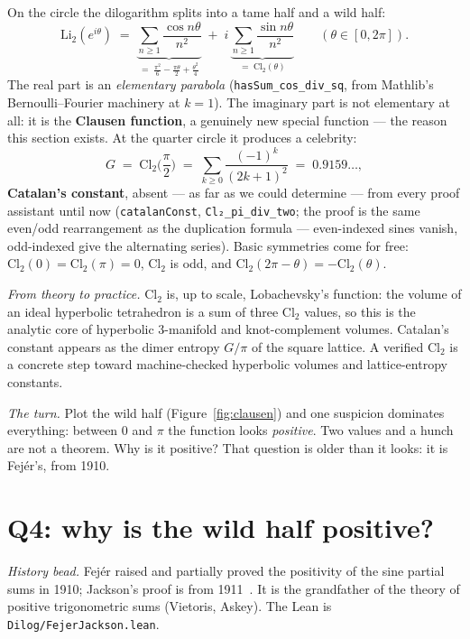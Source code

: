 \documentclass[11pt]{article}
\newcommand{\lean}[1]{\texttt{#1}}
\newcommand{\Li}{\mathrm{Li}_2}
\newcommand{\Cl}{\mathrm{Cl}_2}
\begin{document}
On the circle the dilogarithm splits into a tame half and a wild half:
\[
\Li(e^{i\theta}) \;=\;
\underbrace{\sum_{n\ge1}\frac{\cos n\theta}{n^2}}_{\textstyle
  =\;\frac{\pi^2}{6}-\frac{\pi\theta}{2}+\frac{\theta^2}{4}}
\;+\; i\,\underbrace{\sum_{n\ge1}\frac{\sin n\theta}{n^2}}_{\textstyle =\;\Cl(\theta)}
\qquad(\theta\in[0,2\pi]).
\]
The real part is an \emph{elementary parabola}
(\lean{hasSum\_cos\_div\_sq}, from Mathlib's Bernoulli--Fourier machinery at $k=1$).
The imaginary part is not elementary at all: it is the \textbf{Clausen function}, a
genuinely new special function --- the reason this section exists. At the quarter circle
it produces a celebrity:
\[
G \;=\; \Cl\!\Big(\frac{\pi}{2}\Big) \;=\; \sum_{k\ge0}\frac{(-1)^k}{(2k+1)^2}
\;=\;0.9159\ldots,
\]
\textbf{Catalan's constant}, absent --- as far as we could determine --- from every
proof assistant until now
(\lean{catalanConst}, \lean{Cl₂\_pi\_div\_two}; the proof is the same even/odd
rearrangement as the duplication formula --- even-indexed sines vanish, odd-indexed give
the alternating series). Basic symmetries come for free: $\Cl(0)=\Cl(\pi)=0$, $\Cl$ is
odd, and $\Cl(2\pi-\theta)=-\Cl(\theta)$.

\emph{From theory to practice.} $\Cl$ is, up to scale, Lobachevsky's function: the volume
of an ideal hyperbolic tetrahedron is a sum of three $\Cl$ values, so this is the
analytic core of hyperbolic $3$-manifold and knot-complement volumes. Catalan's constant
appears as the dimer entropy $G/\pi$ of the square lattice. A verified $\Cl$ is a
concrete step toward machine-checked hyperbolic volumes and lattice-entropy constants.

\emph{The turn.} Plot the wild half (Figure~\ref{fig:clausen}) and one suspicion
dominates everything: between $0$ and $\pi$ the function looks \emph{positive}. Two
values and a hunch are not a theorem. Why is it positive? That question is older than
it looks: it is Fej\'er's, from 1910.

\section{Q4: why is the wild half positive?}\label{sec:fejer}

\emph{History bead.} Fej\'er raised and partially proved the positivity of the sine
partial sums in 1910; Jackson's proof is from 1911~\cite{fejer,jackson}. It is the
grandfather of the theory of positive trigonometric sums (Vietoris, Askey). The Lean is
\lean{Dilog/FejerJackson.lean}.
\end{document}
